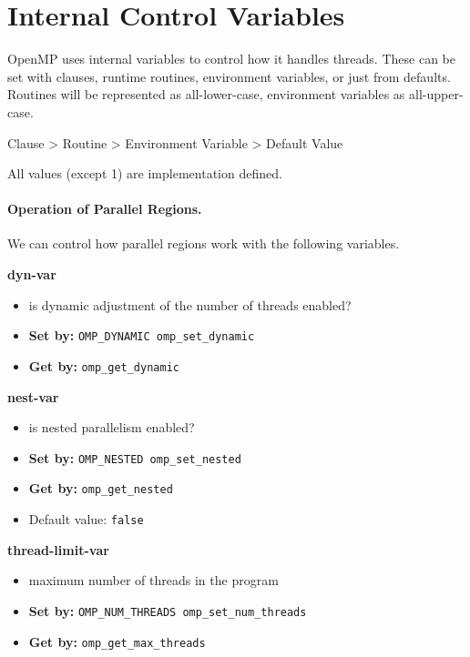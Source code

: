 \section*{Internal Control Variables}

OpenMP uses internal variables to control how it handles threads.
These can be set with clauses, runtime routines, environment
      variables, or just from defaults.
Routines will be represented as all-lower-case, environment variables
      as all-upper-case.

\begin{center}
    Clause \textgreater\- Routine \textgreater\- Environment Variable \textgreater\- Default Value
\end{center}

All values (except 1) are implementation defined.

\paragraph{Operation of Parallel Regions.} We can control how parallel regions work
with the following variables.

  {\bf dyn-var}
  \begin{itemize}
    \item is dynamic adjustment of the number of threads enabled?
    \item {\bf Set by:} {\tt OMP\_DYNAMIC omp\_set\_dynamic}
    \item {\bf Get by:} {\tt omp\_get\_dynamic}
  \end{itemize}

  {\bf nest-var}
  \begin{itemize}
    \item is nested parallelism enabled?
    \item {\bf Set by:} {\tt OMP\_NESTED omp\_set\_nested}
    \item {\bf Get by:} {\tt omp\_get\_nested}
    \item Default value: {\tt false}
  \end{itemize}

  {\bf thread-limit-var}
  \begin{itemize}
    \item maximum number of threads in the program
    \item {\bf Set by:} {\tt OMP\_NUM\_THREADS omp\_set\_num\_threads}
    \item {\bf Get by:} {\tt omp\_get\_max\_threads}
  \end{itemize}


